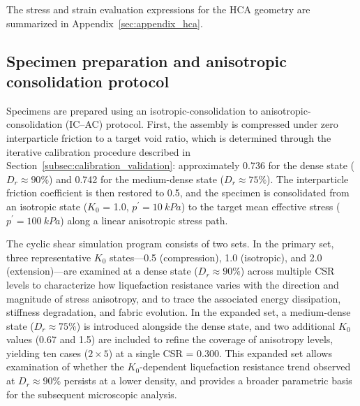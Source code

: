 \documentclass[a4paper,fleqn]{cas-sc}
\newcommand{\Kzero}{\ensuremath{K_0}}
\newcommand{\pmean}{\ensuremath{p^\prime}}
\begin{document}
The stress and strain evaluation expressions for the HCA geometry are summarized in Appendix~\ref{sec:appendix_hca}.

\subsection{Specimen preparation and anisotropic consolidation protocol}
\label{subsec:preparation}

Specimens are prepared using an isotropic-consolidation to anisotropic-consolidation (IC--AC) protocol. First, the assembly is compressed under zero interparticle friction to a target void ratio, which is determined through the iterative calibration procedure described in Section~\ref{subsec:calibration_validation}: approximately 0.736 for the dense state ($D_r \approx 90\%$) and 0.742 for the medium-dense state ($D_r \approx 75\%$). The interparticle friction coefficient is then restored to 0.5, and the specimen is consolidated from an isotropic state (\Kzero{} = 1.0, $\pmean=\SI{10}{kPa}$) to the target mean effective stress ($\pmean=\SI{100}{kPa}$) along a linear anisotropic stress path.

The cyclic shear simulation program consists of two sets. In the primary set, three representative \Kzero{} states---0.5 (compression), 1.0 (isotropic), and 2.0 (extension)---are examined at a dense state ($D_r \approx 90\%$) across multiple CSR levels to characterize how liquefaction resistance varies with the direction and magnitude of stress anisotropy, and to trace the associated energy dissipation, stiffness degradation, and fabric evolution. In the expanded set, a medium-dense state ($D_r \approx 75\%$) is introduced alongside the dense state, and two additional \Kzero{} values (0.67 and 1.5) are included to refine the coverage of anisotropy levels, yielding ten cases ($2 \times 5$) at a single CSR = 0.300. This expanded set allows examination of whether the \Kzero{}-dependent liquefaction resistance trend observed at $D_r \approx 90\%$ persists at a lower density, and provides a broader parametric basis for the subsequent microscopic analysis.
\end{document}
